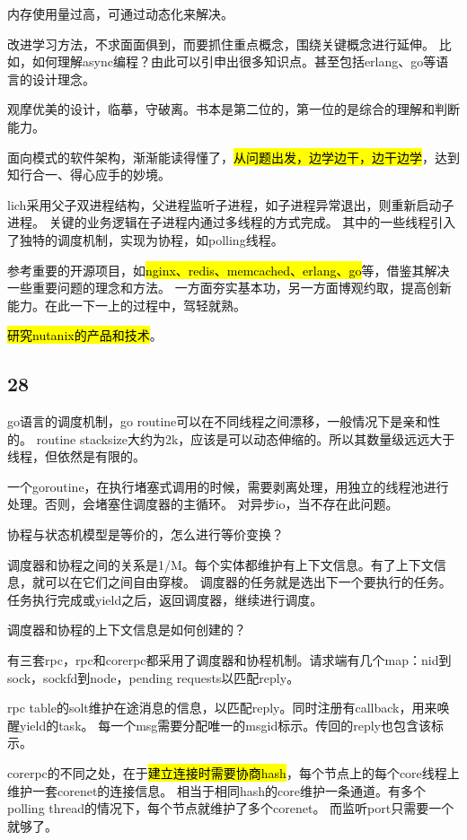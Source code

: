 内存使用量过高，可通过动态化来解决。

\hrulefill

改进学习方法，不求面面俱到，而要抓住重点概念，围绕关键概念进行延伸。
比如，如何理解async编程？由此可以引申出很多知识点。甚至包括erlang、go等语言的设计理念。

观摩优美的设计，临摹，守破离。书本是第二位的，第一位的是综合的理解和判断能力。

面向模式的软件架构，渐渐能读得懂了，\hl{从问题出发，边学边干，边干边学}，达到知行合一、得心应手的妙境。

lich采用父子双进程结构，父进程监听子进程，如子进程异常退出，则重新启动子进程。
关键的业务逻辑在子进程内通过多线程的方式完成。
其中的一些线程引入了独特的调度机制，实现为协程，如polling线程。

参考重要的开源项目，如\hl{nginx、redis、memcached、erlang、go}等，借鉴其解决一些重要问题的理念和方法。
一方面夯实基本功，另一方面博观约取，提高创新能力。在此一下一上的过程中，驾轻就熟。

\hl{研究nutanix的产品和技术}。

\subsection{28}

go语言的调度机制，go routine可以在不同线程之间漂移，一般情况下是亲和性的。
routine stacksize大约为2k，应该是可以动态伸缩的。所以其数量级远远大于线程，但依然是有限的。

一个goroutine，在执行堵塞式调用的时候，需要剥离处理，用独立的线程池进行处理。否则，会堵塞住调度器的主循环。
对异步io，当不存在此问题。

协程与状态机模型是等价的，怎么进行等价变换？

调度器和协程之间的关系是1/M。每个实体都维护有上下文信息。有了上下文信息，就可以在它们之间自由穿梭。
调度器的任务就是选出下一个要执行的任务。任务执行完成或yield之后，返回调度器，继续进行调度。

调度器和协程的上下文信息是如何创建的？

\hrulefill

有三套rpc，rpc和corerpc都采用了调度器和协程机制。请求端有几个map：nid到sock，sockfd到node，pending requests以匹配reply。

rpc table的solt维护在途消息的信息，以匹配reply。同时注册有callback，用来唤醒yield的task。
每一个msg需要分配唯一的msgid标示。传回的reply也包含该标示。

corerpc的不同之处，在于\hl{建立连接时需要协商hash}，每个节点上的每个core线程上维护一套corenet的连接信息。
相当于相同hash的core维护一条通道。有多个polling thread的情况下，每个节点就维护了多个corenet。
而监听port只需要一个就够了。

